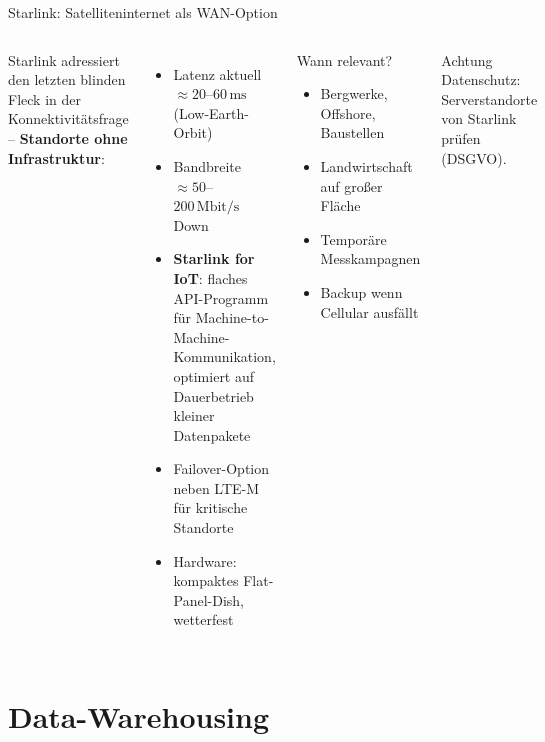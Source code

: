 \documentclass[aspectratio=169]{beamer}
\begin{document}
\begin{frame}{Starlink: Satelliteninternet als WAN-Option}
  \begin{columns}
      Starlink adressiert den letzten blinden Fleck in der
      Konnektivitätsfrage – \textbf{Standorte ohne Infrastruktur}:
      \begin{itemize}
        \item Latenz aktuell $\approx 20$–$60\,\text{ms}$ (Low-Earth-Orbit)
        \item Bandbreite $\approx 50$–$200\,\text{Mbit/s}$ Down
        \item \textbf{Starlink for IoT}: flaches API-Programm für
              Machine-to-Machine-Kommunikation, optimiert auf
              Dauerbetrieb kleiner Datenpakete
        \item Failover-Option neben LTE-M für kritische Standorte
        \item Hardware: kompaktes Flat-Panel-Dish, wetterfest
      \end{itemize}
      \begin{block}{Wann relevant?}
        \begin{itemize}
          \item Bergwerke, Offshore, Baustellen
          \item Landwirtschaft auf großer Fläche
          \item Temporäre Messkampagnen
          \item Backup wenn Cellular ausfällt
        \end{itemize}
      \end{block}
      \begin{alertblock}{Achtung}
        Datenschutz: Serverstandorte
        von Starlink prüfen (DSGVO).
      \end{alertblock}
  \end{columns}
\end{frame}

\section{Data-Warehousing}
\end{document}

